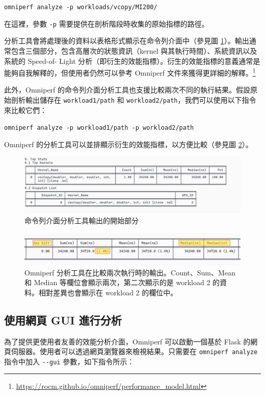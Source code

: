 \lstinline|omniperf analyze -p workloads/vcopy/MI200/|

在這裡，參數 \lstinline|-p| 需要提供在剖析階段時收集的原始指標的路徑。

分析工具會將處理後的資料以表格形式顯示在命令列介面中（參見圖 \ref{fig:omniperf-cli}）。輸出通常包含三個部分，包含高層次的狀態資訊（kernel 與其執行時間）、系統資訊以及系統的 Speed-of-
Light 分析（即衍生的效能指標）。衍生的效能指標的意義通常是能夠自我解釋的，但使用者仍然可以參考 Omniperf 文件來獲得更詳細的解釋。\footnote{\url{https://rocm.github.io/omniperf/performance_model.html}}

此外，Omniperf 的命令列介面分析工具也支援比較兩次不同的執行結果。假設原始剖析輸出儲存在 \lstinline|workload1/path| 和 \lstinline|workload2/path|，我們可以使用以下指令來比較它們：

\lstinline|omniperf analyze -p workload1/path -p workload2/path|

Omniperf 的分析工具可以並排顯示衍生的效能指標，以方便比較（參見圖 \ref{fig:omniperf-compare}）。

\begin{figure}
    \centering
    \includegraphics[width=1\linewidth]{Appendici/OmniperfCLI.png}
    \caption{命令列介面分析工具輸出的開始部分}
    \label{fig:omniperf-cli}
\end{figure}

\begin{figure}
    \centering
    \includegraphics[width=1\linewidth]{Appendici/OmniperfCompare.png}
    \caption{Omniperf 分析工具在比較兩次執行時的輸出。Count、Sum、Mean 和 Median 等欄位會顯示兩次，第二次顯示的是 workload 2 的資料。相對差異也會顯示在 workload 2 的欄位中。}
    \label{fig:omniperf-compare}
\end{figure}


\subsection{使用網頁 GUI 進行分析}
為了提供更使用者友善的效能分析介面，Omniperf 可以啟動一個基於 Flask \cite{grinberg2018flask} 的網頁伺服器。使用者可以透過網頁瀏覽器來檢視結果。只需要在 \lstinline|omniperf analyze| 指令中加入 \lstinline|--gui| 參數，如下指令所示：

